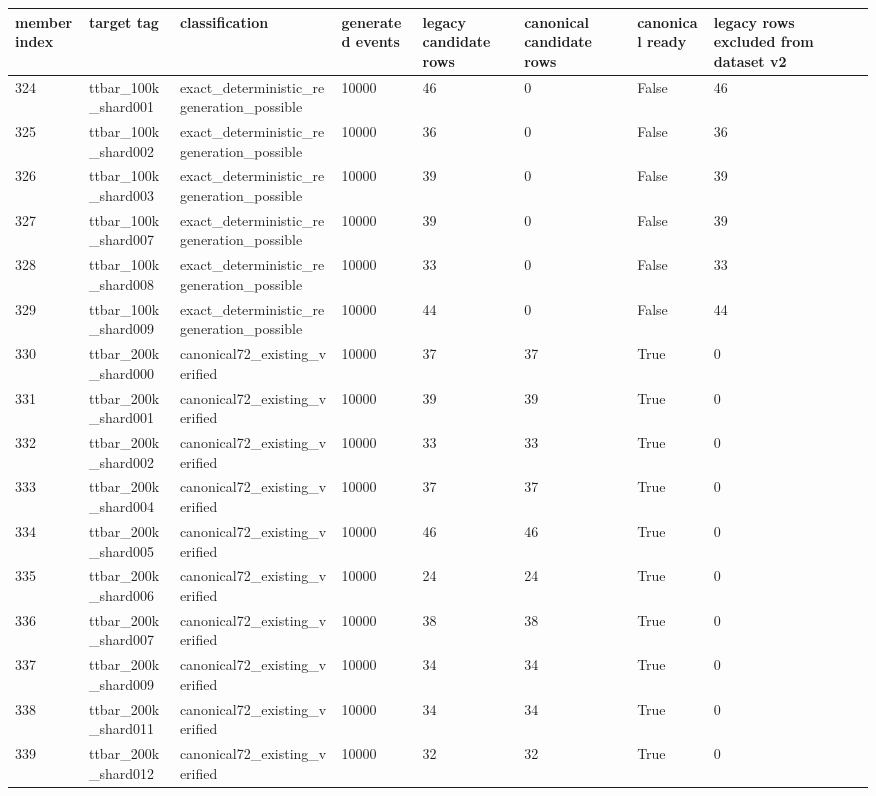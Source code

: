 \begin{table}[htbp]
\centering
\scriptsize
\begin{tabular}{llllllll}
\toprule
member index & target tag & classification & generated events & legacy candidate rows & canonical candidate rows & canonical ready & legacy rows excluded from dataset v2 \\
\midrule
324 & ttbar\_100k\_shard001 & exact\_deterministic\_regeneration\_possible & 10000 & 46 & 0 & False & 46 \\
325 & ttbar\_100k\_shard002 & exact\_deterministic\_regeneration\_possible & 10000 & 36 & 0 & False & 36 \\
326 & ttbar\_100k\_shard003 & exact\_deterministic\_regeneration\_possible & 10000 & 39 & 0 & False & 39 \\
327 & ttbar\_100k\_shard007 & exact\_deterministic\_regeneration\_possible & 10000 & 39 & 0 & False & 39 \\
328 & ttbar\_100k\_shard008 & exact\_deterministic\_regeneration\_possible & 10000 & 33 & 0 & False & 33 \\
329 & ttbar\_100k\_shard009 & exact\_deterministic\_regeneration\_possible & 10000 & 44 & 0 & False & 44 \\
330 & ttbar\_200k\_shard000 & canonical72\_existing\_verified & 10000 & 37 & 37 & True & 0 \\
331 & ttbar\_200k\_shard001 & canonical72\_existing\_verified & 10000 & 39 & 39 & True & 0 \\
332 & ttbar\_200k\_shard002 & canonical72\_existing\_verified & 10000 & 33 & 33 & True & 0 \\
333 & ttbar\_200k\_shard004 & canonical72\_existing\_verified & 10000 & 37 & 37 & True & 0 \\
334 & ttbar\_200k\_shard005 & canonical72\_existing\_verified & 10000 & 46 & 46 & True & 0 \\
335 & ttbar\_200k\_shard006 & canonical72\_existing\_verified & 10000 & 24 & 24 & True & 0 \\
336 & ttbar\_200k\_shard007 & canonical72\_existing\_verified & 10000 & 38 & 38 & True & 0 \\
337 & ttbar\_200k\_shard009 & canonical72\_existing\_verified & 10000 & 34 & 34 & True & 0 \\
338 & ttbar\_200k\_shard011 & canonical72\_existing\_verified & 10000 & 34 & 34 & True & 0 \\
339 & ttbar\_200k\_shard012 & canonical72\_existing\_verified & 10000 & 32 & 32 & True & 0 \\

\end{tabular}
\end{table}
